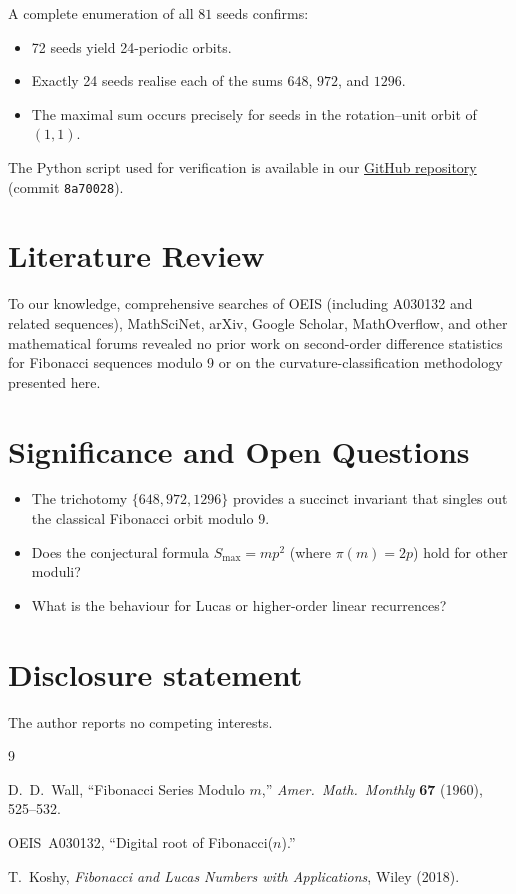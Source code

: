 \documentclass[12pt]{article}
\begin{document}
A complete enumeration of all $81$ seeds confirms:
\begin{itemize}
\item 72 seeds yield 24-periodic orbits.
\item Exactly 24 seeds realise each of the sums $648$, $972$, and $1296$.
\item The maximal sum occurs precisely for seeds in the rotation–unit orbit of
      $(1,1)$.
\end{itemize}
The Python script used for verification is available in our
\href{https://github.com/founder-guy/fibonacci-mod9-curvature}{GitHub repository}
(commit \texttt{8a70028}).

\section{Literature Review}

To our knowledge, comprehensive searches of OEIS (including A030132 and related
sequences), MathSciNet, arXiv, Google Scholar, MathOverflow, and other
mathematical forums revealed no prior work on second-order difference statistics
for Fibonacci sequences modulo 9 or on the curvature-classification methodology
presented here.

\section{Significance and Open Questions}

\begin{itemize}
\item The trichotomy $\{648,972,1296\}$ provides a succinct invariant that
      singles out the classical Fibonacci orbit modulo 9.
\item Does the conjectural formula $S_{\max}=mp^{2}$ (where $\pi(m)=2p$) hold
      for other moduli?
\item What is the behaviour for Lucas or higher-order linear recurrences?
\end{itemize}

\section*{Disclosure statement}
\noindent The author reports no competing interests.

\begin{thebibliography}{9}

D.~D.~Wall,
``Fibonacci Series Modulo $m$,''
\textit{Amer.\ Math.\ Monthly} \textbf{67} (1960), 525--532.

OEIS~A030132, ``Digital root of Fibonacci($n$).''

T.~Koshy,
\textit{Fibonacci and Lucas Numbers with Applications},
Wiley (2018).

\end{thebibliography}
\end{document}
